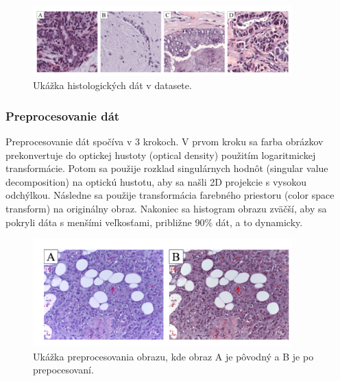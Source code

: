 \begin{figure}[h!]
\begin{centering}
\includegraphics[width=10cm]{assets/images/252_1.png}
\par\end{centering}
\caption{Ukážka histologických dát v datasete. \label{fig:dynabook}\cite{araujo2017classification}}
\end{figure}

\subsubsection*{Preprocesovanie dát}
\hspace{10mm}Preprocesovanie dát spočíva v 3 krokoch. V  prvom kroku sa farba obrázkov prekonvertuje do optickej hustoty (optical density) použitím logaritmickej transformácie. Potom sa použije rozklad singulárnych hodnôt (singular value decomposition) na optickú hustotu, aby sa našli 2D projekcie s vysokou odchýlkou. Následne sa použije transformácia farebného priestoru (color space transform) na originálny obraz. Nakoniec sa histogram obrazu zväčší, aby sa pokryli dáta s menšími veľkosťami, približne 90\% dát, a to dynamicky. 
 
\begin{figure}[h!]
\begin{centering}
\includegraphics[width=10cm]{assets/images/252_2.png}
\par\end{centering}
\caption{Ukážka preprocesovania obrazu, kde obraz A je pôvodný a B je po prepocesovaní. \label{fig:dynabook}\cite{araujo2017classification}}
\end{figure}

